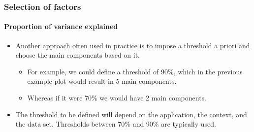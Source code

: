 \documentclass[
  shownotes,
  xcolor={svgnames},
  hyperref={colorlinks,citecolor=DarkBlue,linkcolor=DarkRed,urlcolor=DarkBlue}
  , aspectratio=169]{beamer}
\begin{document}
\begin{frame}
\frametitle{Selection of factors}
\framesubtitle{Proportion of variance explained}

\begin{itemize}
\item Another approach often used in practice is to impose a threshold a priori and choose the main components based on it. 
\medskip
  \begin{itemize}
    \item For example, we could define a threshold of 90\%, which in the previous example plot would result in 5 main components. 
    \medskip
    \item Whereas if it were 70\% we would have 2 main components.
  \end{itemize}
\medskip  
\item The threshold to be defined will depend on the application, the context, and the data set. Thresholds between 70\% and 90\% are typically used.
\end{itemize}


\end{frame}
\end{document}
